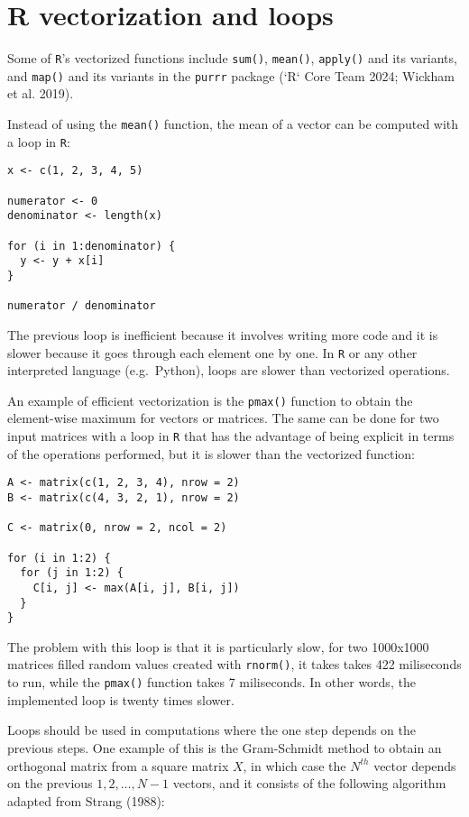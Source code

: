 \hypertarget{r-vectorization-and-loops}{%
\section{R vectorization and loops}\label{r-vectorization-and-loops}}

Some of \texttt{R}'s vectorized functions include \texttt{sum()}, \texttt{mean()}, \texttt{apply()} and its
variants, and \texttt{map()} and its variants in the \texttt{purrr} package
(`R` Core Team 2024; Wickham et al. 2019).

Instead of using the \texttt{mean()} function, the mean of a vector can be computed
with a loop in \texttt{R}:

\begin{verbatim}
x <- c(1, 2, 3, 4, 5)

numerator <- 0
denominator <- length(x)

for (i in 1:denominator) {
  y <- y + x[i]
}

numerator / denominator
\end{verbatim}

The previous loop is inefficient because it involves writing more code and it is
slower because it goes through each element one by one. In \texttt{R} or any other
interpreted language (e.g.~Python), loops are slower than vectorized
operations.

An example of efficient vectorization is the \texttt{pmax()} function to obtain the
element-wise maximum for vectors or matrices. The same can be done for two input
matrices with a loop in \texttt{R} that has the advantage of being explicit in terms of
the operations performed, but it is slower than the vectorized function:

\begin{verbatim}
A <- matrix(c(1, 2, 3, 4), nrow = 2)
B <- matrix(c(4, 3, 2, 1), nrow = 2)

C <- matrix(0, nrow = 2, ncol = 2)

for (i in 1:2) {
  for (j in 1:2) {
    C[i, j] <- max(A[i, j], B[i, j])
  }
}
\end{verbatim}

The problem with this loop is that it is particularly slow, for two 1000x1000
matrices filled random values created with \texttt{rnorm()}, it takes takes 422
miliseconds to run, while the \texttt{pmax()} function takes 7 miliseconds. In other
words, the implemented loop is twenty times slower.

Loops should be used in computations where the one step depends on the previous
steps. One example of this is the Gram-Schmidt method to obtain an orthogonal
matrix from a square matrix \(X\), in which case the \(N^{th}\) vector depends on
the previous \(1,2,\ldots,N-1\) vectors, and it consists of the following
algorithm adapted from Strang (1988):

